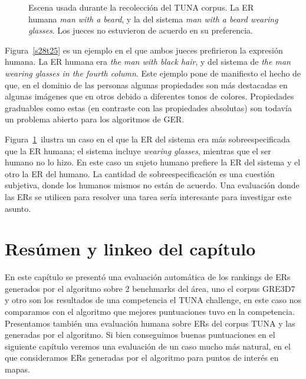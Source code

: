 \begin{figure}[H]
\begin{minipage}{0.48\linewidth}
\vspace*{-.3cm}
\caption{Escena usada durante la recolecci\'on del TUNA corpus. La ER humana \emph{man with a beard},  y la del sistema \emph{man with a beard wearing glasses}. Los jueces no estuvieron de acuerdo en su preferencia.}
\label{s307t21}
\end{minipage}
\end{figure}

Figura~\ref{s28t25} es un ejemplo en el que ambos jueces prefirieron la expresi\'on humana. La ER humana era {\it the man with black hair}, y del sistema de {\it the man wearing glasses in the fourth column}. Este ejemplo pone de manifiesto el hecho de que, en el dominio de las personas algunas propiedades son m\'as destacadas en algunas im\'agenes que en otros debido a diferentes tonos de colores. Propiedades graduables como estas (en contraste con las propiedades absolutas) son todav\'{i}a un problema abierto para los algoritmos de GER.

Figura~\ref{s307t21}~ilustra un caso en el que la ER del sistema era m\'as sobreespecificada que la ER humana; el sistema incluye {\it wearing glasses}, mientras que el ser humano no lo hizo. En este caso un sujeto humano prefiere la ER del sistema y el otro la ER del humano. La cantidad de sobreespecificaci\'on es una cuesti\'on subjetiva, donde los humanos mismos no est\'an de acuerdo. Una evaluaci\'on donde las ERs se utilicen para resolver una tarea ser\'{i}a interesante para investigar este asunto.

\section{Res\'umen y linkeo del cap\'itulo}

En este cap\'itulo se present\'o una evaluaci\'on autom\'atica de los rankings de ERs generados por el algoritmo sobre 2 benchmarks del \'area, uno el corpus GRE3D7 y otro son los resultados de una competencia el TUNA challenge, en este caso nos comparamos con el algoritmo que mejores puntuaciones tuvo en la competencia. Presentamos tambi\'en una evaluaci\'on humana sobre ERs del corpus TUNA y las generadas por el algoritmo. Si bien conseguimos buenas puntuaciones en el siguiente cap\'itulo veremos una evaluaci\'on de un caso mucho m\'as natural, en el que consideramos ERs generadas por el algoritmo para puntos de inter\'es en mapas. 

